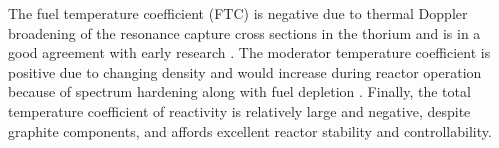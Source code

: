 The fuel temperature coefficient (FTC) is negative due to thermal Doppler 
broadening of the resonance capture cross sections in the thorium and is in a 
good agreement with early research 
\cite{robertson_conceptual_1971,park_whole_2015}. The moderator temperature 
coefficient is positive due to changing density and would increase during 
reactor operation because of spectrum hardening along with fuel depletion 
\cite{park_whole_2015}. Finally, the total temperature coefficient of 
reactivity is relatively large and negative, despite graphite components, and 
affords excellent reactor stability and controllability.